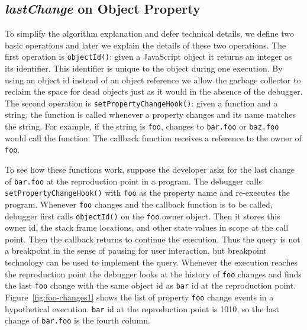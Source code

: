 \documentclass{sig-alternate}
\begin{document}
\subsection{{\large\bf\textit{lastChange}} on Object Property}
To simplify the algorithm explanation and defer technical details, we
define two basic operations and later we explain the details of these
two operations. The first operation is \texttt{objectId()}: given a
JavaScript object it returns an integer as its identifier. This
identifier is unique to the object during one execution.  By using an
object id instead of an object reference we allow the garbage
collector to reclaim the space for dead objects just as it would in the
absence of the debugger. The second
operation is \texttt{setPropertyChangeHook()}: given a function and a
string, the function is called whenever a property changes and its
name matches the string. For example, if the string is 
\texttt{foo}, changes to \texttt{bar.foo} or \texttt{baz.foo} would
call the function.  The callback function receives a reference to the
owner of \texttt{foo}. 

To see how these functions work, suppose the developer asks for the
last change of \texttt{bar.foo} at the reproduction point in a
program. The debugger calls \texttt{setPropertyChangeHook()} with
\texttt{foo} as the property name and re-executes the
program. Whenever \texttt{foo} changes and the callback function is to
be called, debugger first calls \texttt{objectId()} on the
\texttt{foo} owner object. Then it stores this owner id, the stack
frame locations, and other state values in scope at the call point. 
Then the callback returns to continue the execution. Thus the query is not 
a breakpoint in the sense of pausing for user interaction, but breakpoint 
technology can be used to implement the query.
Whenever the execution reaches the reproduction point the debugger
looks at the history of \texttt{foo} changes and finds the last
\texttt{foo} change with the same object id as \texttt{bar} id at the
reproduction point. Figure~\ref{fig:foo-changes1} shows the list of
property \texttt{foo} change events in a hypothetical
execution. \texttt{bar} id at the reproduction point is 1010, so the
last change of \texttt{bar.foo} is the fourth column. 
\end{document}
